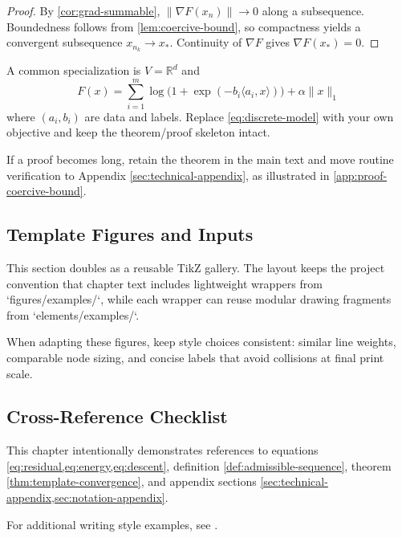 \begin{proof}
By \cref{cor:grad-summable}, $\|\nabla F(x_n)\|\to 0$ along a subsequence. Boundedness follows from \cref{lem:coercive-bound}, so compactness yields a convergent subsequence $x_{n_k}\to x_\ast$. Continuity of $\nabla F$ gives $\nabla F(x_\ast)=0$.
\end{proof}

\begin{example}
\label{ex:discrete-model}
A common specialization is $V=\mathbb{R}^d$ and
\begin{equation}
\label{eq:discrete-model}
F(x)=\sum_{i=1}^{m}\log\bigl(1+\exp(-b_i\langle a_i,x\rangle)\bigr)+\alpha\|x\|_1
\end{equation}
where $(a_i,b_i)$ are data and labels. Replace \cref{eq:discrete-model} with your own objective and keep the theorem/proof skeleton intact.
\end{example}

\begin{remark}
\label{rem:appendix-ref}
If a proof becomes long, retain the theorem in the main text and move routine verification to Appendix \ref{sec:technical-appendix}, as illustrated in \cref{app:proof-coercive-bound}.
\end{remark}

\subsection{Template Figures and Inputs}
\label{ssec:template-figures}

This section doubles as a reusable TikZ gallery. The layout keeps the project convention that chapter text includes lightweight wrappers from `figures/examples/`, while each wrapper can reuse modular drawing fragments from `elements/examples/`.








When adapting these figures, keep style choices consistent: similar line weights, comparable node sizing, and concise labels that avoid collisions at final print scale.

\subsection{Cross-Reference Checklist}
\label{ssec:checklist}

This chapter intentionally demonstrates references to equations \cref{eq:residual,eq:energy,eq:descent}, definition \cref{def:admissible-sequence}, theorem \cref{thm:template-convergence}, and appendix sections \cref{sec:technical-appendix,sec:notation-appendix}.

For additional writing style examples, see \cite{tao2011book,knuth1984texbook}.
